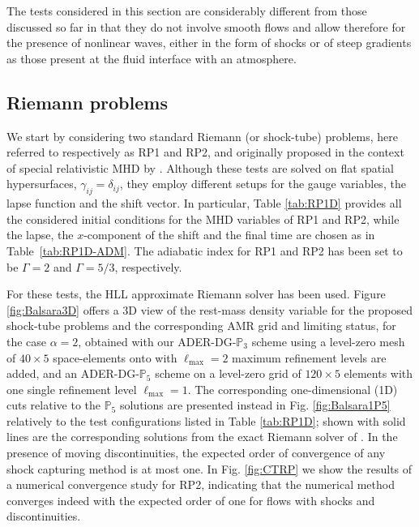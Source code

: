 The tests considered in this section are considerably different from
those discussed so far in that they do not involve smooth flows and allow
therefore for the presence of nonlinear waves, either in the form of
shocks or of steep gradients as those present at the fluid interface with
an atmosphere.


\subsection{Riemann problems}\label{sec:grmhd-riemann-problems}
We start by considering two standard Riemann (or shock-tube) problems,
here referred to respectively as RP1 and RP2, and originally proposed in
the context of {special} relativistic MHD by \cite{Balsara2001}. Although
these tests are solved on flat spatial hypersurfaces, \ie
$\gamma_{ij}=\delta_{ij}$,
they employ different setups for the gauge variables, the
lapse function and the shift vector. In particular, Table \ref{tab:RP1D}
provides all the considered initial conditions for the MHD variables of
RP1 and RP2, while the lapse, the $x$-component of the shift and the
final time are chosen as in Table~\ref{tab:RP1D-ADM}.
The adiabatic index for RP1 and RP2 has been set to be $\Gamma=2$ and 
$\Gamma=5/3$, respectively.

For these tests, the HLL approximate Riemann solver has been used. Figure
\ref{fig:Balsara3D} offers a 3D view of the rest-mass density variable
for the proposed shock-tube problems and the corresponding AMR grid and
limiting status, for the case $\alpha=2$, obtained with our
ADER-DG-$\mathbb{P}_3$ scheme using a level-zero mesh of $40\times5$
space-elements onto with $\ell_{\text{max}}=2$ maximum refinement levels
are added, and an ADER-DG-$\mathbb{P}_5$ scheme on a level-zero grid of
$120\times5$ elements with one single refinement level
$\ell_{\max}=1$. The corresponding one-dimensional (1D) cuts relative to
the $\mathbb{P}_5$ solutions are presented instead in
Fig. \ref{fig:Balsara1P5} relatively to the test configurations
listed in Table \ref{tab:RP1D}; shown with solid
 lines are the corresponding
solutions from the exact Riemann solver of \cite{Giacomazzo:2005jy}.
{
In the presence of moving discontinuities, the expected order of convergence 
of any shock capturing method is at most one. In Fig. \ref{fig:CTRP} 
we show the results of a numerical convergence study for RP2, indicating 
that the numerical method converges indeed with the expected order of one 
for flows with shocks and discontinuities. 
}

